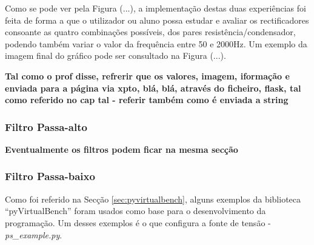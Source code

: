 Como se pode ver pela Figura (...), a implementação destas duas experiências foi feita de forma a que o utilizador ou aluno possa estudar e avaliar os rectificadores consoante as quatro combinações possíveis, dos pares resistência/condensador, podendo também variar o valor da frequência entre 50 e 2000Hz. Um exemplo da imagem final do gráfico pode ser consultado na Figura (...).

\textbf{Tal como o prof disse, refrerir que os valores, imagem, iformação e enviada para a página via xpto, blá, blá, através do ficheiro, flask, tal como referido no cap tal - referir também como é enviada a string}

\subsubsection{Filtro Passa-alto}
\label{sec:passa-alto}
\textbf{Eventualmente os filtros podem ficar na mesma secção}
\subsubsection{Filtro Passa-baixo}
\label{sec:passa-baixo}


Como foi referido na Secção \ref{sec:pyvirtualbench}, alguns exemplos da biblioteca ``pyVirtualBench'' foram usados como base para o desenvolvimento da programação. Um desses exemplos é o que configura a fonte de tensão - \textit{ps\_example.py}.


